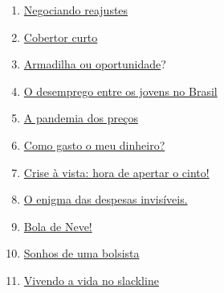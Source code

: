 \begin{apresentacao}
\begin{multicols}{2}

\begin{enumerate}[label=Atividade \arabic* --, wide]
\item \hyperref[fin-ativ-1]{Negociando reajustes}
\item \hyperref[fin-ativ-2]{Cobertor curto}
\end{enumerate}


\begin{enumerate}[label=Atividade \arabic* --, wide]\setcounter{enumi}{2}
\item \hyperref[fin-ativ-3]{Armadilha ou oportunidade}?
\item \hyperref[fin-ativ-4]{O desemprego entre os jovens no Brasil}
\item \hyperref[fin-ativ-5]{A pandemia dos preços}
\end{enumerate}
\vspace{1cm}

\begin{enumerate}[label=Atividade \arabic* --, wide]\setcounter{enumi}{5}
\item \hyperref[fin-ativ-6]{Como gasto o meu dinheiro?}
\item \hyperref[fin-ativ-7]{Crise à vista: hora de apertar o cinto!}
\end{enumerate}

\begin{enumerate}[label=Atividade \arabic* --, wide]\setcounter{enumi}{7}
\item \hyperref[fin-ativ-8]{O enigma das despesas invisíveis.}
\item \hyperref[fin-ativ-9]{Bola de Neve!}
\end{enumerate}

\begin{enumerate}[label=Atividade \arabic* --, wide]\setcounter{enumi}{9}
\item \hyperref[fin-ativ-10]{Sonhos de uma bolsista}
\item \hyperref[fin-ativ-11]{Vivendo a vida no slackline}
\end{enumerate}
\vspace{1em}
\columnbreak


\end{multicols}
\end{apresentacao}
